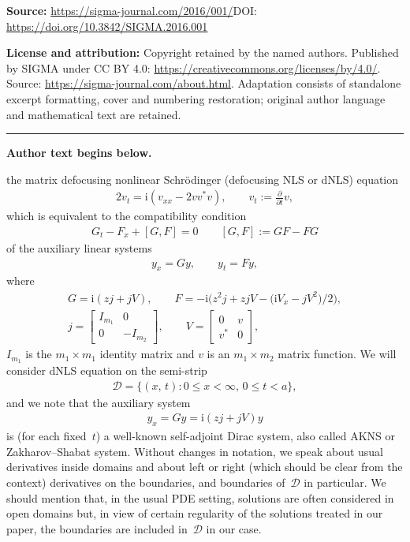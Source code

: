 \documentclass[11pt]{article}
\def\p{\partial}
\newcommand{\I}{\mathrm{i}}
\newcommand{\cD}{{\mathcal D}}
\numberwithin{equation}{section}
\begin{document}
\noindent\textbf{Source:} \url{https://sigma-journal.com/2016/001/}\quad DOI: \url{https://doi.org/10.3842/SIGMA.2016.001}\par
\noindent\textbf{License and attribution:} Copyright retained by the named authors. Published by SIGMA under CC BY 4.0: \url{https://creativecommons.org/licenses/by/4.0/}. Source: \url{https://sigma-journal.com/about.html}. Adaptation consists of standalone excerpt formatting, cover and numbering restoration; original author language and mathematical text are retained.\par
\medskip\hrule\medskip\noindent\textbf{Author text begins below.}\par
\setcounter{section}{1}
\setcounter{subsection}{0}
\setcounter{subsubsection}{0}
\setcounter{Theorem}{0}
\setcounter{equation}{0}
the matrix defocusing nonlinear Schr\"odinger (defocusing NLS or dNLS) equation
\begin{gather} \label{1.1}
2v_t=\I(v_{xx}-2vv^*v), \qquad v_t:=\frac{\p}{\p t}v ,
\end{gather}
which is equivalent \cite{ZS1, ZS2} to the compatibility condition
\begin{gather} \label{zc}
G_t-F_x+[G,F]=0 \qquad [G,F]:=GF-FG
\end{gather}
of the auxiliary linear systems
\begin{gather} \label{au}
y_x=Gy, \qquad y_t=Fy,
\end{gather}
where
\begin{gather} \label{1.2}
G=\I (zj+jV), \qquad
F=-\I\big(z^2 j+ z jV-\big(\I V_x-jV^2\big)/2\big), \\
\label{1.3}
j = \left[
\begin{matrix}
I_{m_1} & 0 \\ 0 & -I_{m_2}
\end{matrix}
\right], \qquad V= \left[\begin{matrix}
0&v\\v^{*}&0\end{matrix}\right],
\end{gather}
$I_{m_1}$ is the $m_1\times m_1$ identity matrix and $v$ is an $m_1\times m_2$ matrix function.
We will consider dNLS equation on the semi-strip
\begin{gather}  \label{1.4}
{\mathcal D}=\{(x,\, t)\colon 0 \leq x <\infty, \, 0\leq t<a\},
\end{gather}
and we note that the auxiliary system
\begin{gather} \label{1.5}
y_x=Gy=\I(zj+jV)y
\end{gather}
is (for each f\/ixed~$t$) a well-known self-adjoint Dirac system, also called AKNS or Zakharov--Shabat system.
Without changes in notation, we speak about usual derivatives inside domains
and about left or right
(which should be clear from the context) derivatives
on the boundaries, and boundaries of~$\cD$ in particular.
We should mention that, in the usual PDE setting, solutions are often considered in open domains
but, in view of certain regularity of the solutions treated in our paper, the boundaries are included
in~${\mathcal D}$ in our case.
\end{document}
